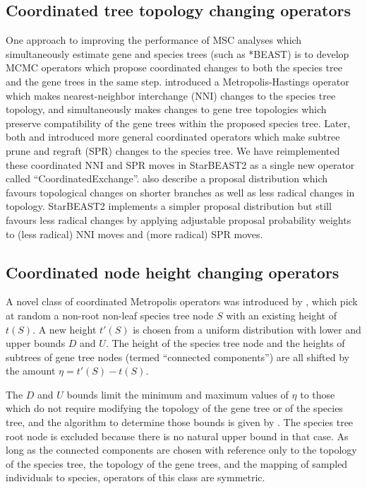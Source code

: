 \documentclass[nogrid]{MBE}%
\begin{document}
\subsection{Coordinated tree topology changing operators}

One approach to improving the performance of MSC analyses which simultaneously
estimate gene and species trees (such as *BEAST) is to develop MCMC operators
which propose coordinated changes to both the species tree and the gene trees in
the same step. \cite{Yang01122014} introduced a Metropolis-Hastings \citep[MH;][]{Metropolis1953, Hastings1970}
operator which makes nearest-neighbor interchange (NNI) changes to the species
tree topology, and simultaneously makes changes to gene tree topologies which
preserve compatibility of the gene trees within the proposed species tree.
Later, both \cite{Jones2016} and \cite{2015arXiv151203843R} introduced more
general coordinated operators which make subtree prune and regraft (SPR) changes
to the species tree. We have reimplemented these coordinated NNI and SPR moves
in StarBEAST2 as a single new operator called ``CoordinatedExchange''.
\cite{2015arXiv151203843R} also describe a proposal distribution which favours
topological changes on shorter branches as well as less radical changes in
topology. StarBEAST2 implements a simpler proposal distribution but still
favours less radical changes by applying adjustable proposal probability weights
to (less radical) NNI moves and (more radical) SPR moves.

\subsection{Coordinated node height changing operators}

A novel class of coordinated Metropolis operators was introduced by
\cite{Jones2016}, which pick at random a non-root non-leaf species tree node
$S$ with an existing height of $t(S)$. A new height $t'(S)$ is chosen from a
uniform distribution with lower and upper bounds $D$ and $U$. The height of
the species tree node and the heights of subtrees of gene tree nodes (termed
``connected components'') are all shifted by the amount $\eta = t'(S) - t(S)$.

The $D$ and $U$ bounds limit the minimum and maximum values of $\eta$ to those
which do not require modifying the topology of the gene tree or of the species
tree, and the algorithm to determine those bounds is given by
\cite{Jones2016}. The species tree root node is excluded because there is no
natural upper bound in that case. As long as the connected components are
chosen with reference only to the topology of the species tree, the topology
of the gene trees, and the mapping of sampled individuals to species,
operators of this class are symmetric.
\end{document}
